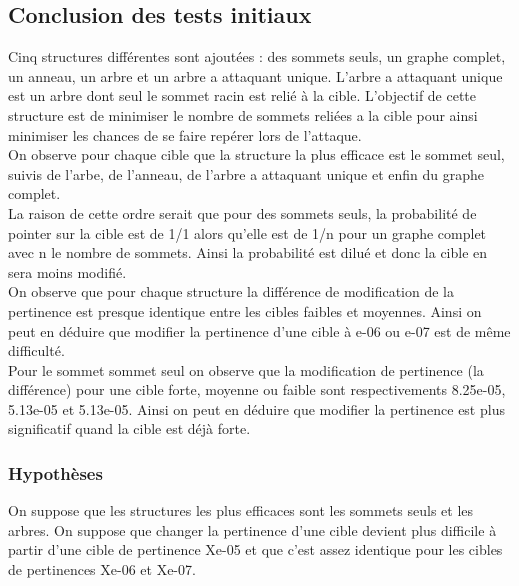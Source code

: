 \documentclass[a4paper,11pt]{article}
\begin{document}
	\subsection{Conclusion des tests initiaux}
		Cinq structures différentes sont ajoutées : des sommets seuls, un graphe complet, un anneau, un arbre et un arbre a attaquant unique. L'arbre a attaquant unique est un arbre dont seul le sommet racin est relié 
		à la cible. L'objectif de cette structure est de minimiser le nombre de sommets reliées a la cible pour ainsi minimiser les chances de se faire repérer lors de l'attaque.\\
		On observe pour chaque cible que la structure la plus efficace est le sommet seul, suivis de l'arbe, de l'anneau, de l'arbre a attaquant unique et enfin du graphe complet.\\
		La raison de cette ordre serait que pour des sommets seuls, la probabilité de pointer sur la cible est de 1/1 alors qu'elle est de 1/n pour un graphe complet
		avec n le nombre de sommets. Ainsi la probabilité est dilué et donc la cible en sera moins modifié.\\
		On observe que pour chaque structure la différence de modification de la pertinence est presque identique entre les cibles faibles et moyennes.
		Ainsi on peut en déduire que modifier la pertinence d'une cible à e-06 ou e-07 est de même difficulté.\\		
		Pour le sommet sommet seul on observe que la modification de pertinence (la différence) pour une cible forte, moyenne ou faible sont respectivements
		8.25e-05, 5.13e-05 et 5.13e-05. Ainsi on peut en déduire que modifier la pertinence est plus significatif quand la cible est déjà forte.
			
		\subsubsection{Hypothèses}
			On suppose que les structures les plus efficaces sont les sommets seuls et les arbres. On suppose que changer la pertinence d'une cible devient 
			plus difficile à partir d'une cible de pertinence Xe-05 et que c'est assez identique pour les cibles de pertinences Xe-06 et Xe-07.
\end{document}
